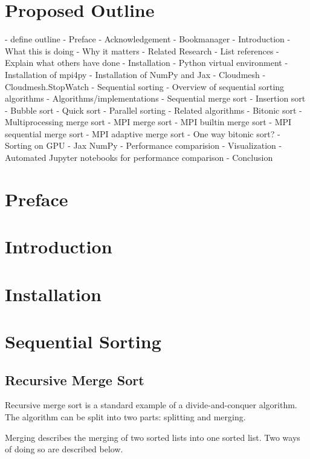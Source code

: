 \section{Proposed Outline}

- define outline
- Preface
    - Acknowledgement
    - Bookmanager
- Introduction
    - What this is doing
    - Why it matters
    - Related Research
        - List references
        - Explain what others have done
- Installation
    - Python virtual environment
    - Installation of mpi4py
    - Installation of NumPy and Jax
    - Cloudmesh
        - Cloudmesh.StopWatch
- Sequential sorting
    - Overview of sequential sorting algorithms
    - Algorithms/implementations
        - Sequential merge sort
        - Insertion sort
        - Bubble sort
        - Quick sort
- Parallel sorting
    - Related algorithms
        - Bitonic sort
    - Multiprocessing merge sort
    - MPI merge sort
        - MPI builtin merge sort
        - MPI sequential merge sort
        - MPI adaptive merge sort
            - One way bitonic sort?
- Sorting on GPU
    - Jax NumPy
- Performance comparision
- Visualization
    - Automated Jupyter notebooks for performance comparison
- Conclusion

\section{Preface}

\section{Introduction}

\section{Installation}

\section{Sequential Sorting}

\subsection{Recursive Merge Sort}

Recursive merge sort is a standard example of a divide-and-conquer algorithm. The algorithm can be split into two parts:
splitting and merging.

Merging describes the merging of two sorted lists into one sorted list. Two ways of doing so are described below.

